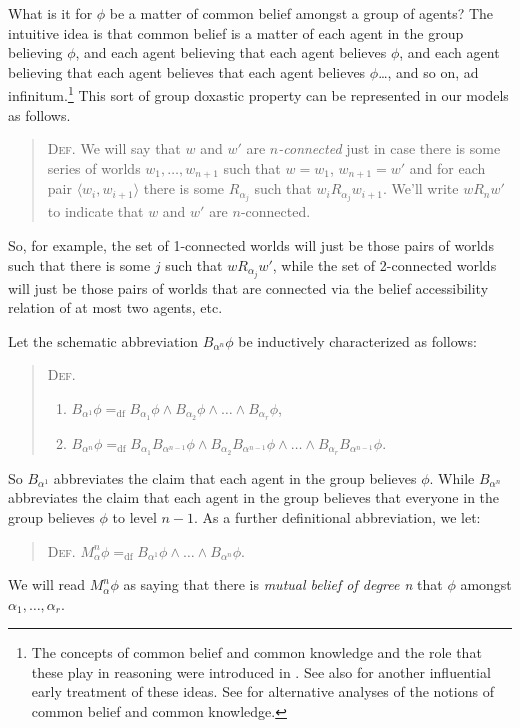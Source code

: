 What is it for $\phi$ be a matter of common belief amongst a group of agents?
The intuitive idea is that common belief is a matter of each agent in the group believing $\phi$, and each agent believing that each agent believes $\phi$, and each agent believing that each agent believes that each agent believes $\phi$\ldots, and so on, ad infinitum.\footnote{The concepts of common belief and common knowledge and the role that these play in reasoning were introduced in \citet{Lewis7}. See also \citet{Aumann2} for another influential early treatment of these ideas. See \citet{Barwise1} for alternative analyses of the notions of common belief and common knowledge.}
This sort of group doxastic property can be represented in our models as follows.
\begin{quote}
\textsc{Def.}\; We will say that $w$ and $w'$ are \textit{$n$-connected} just in case there is some series of worlds $w_1,\ldots,w_{n + 1}$ such that $w = w_1$, $w_{n+1} = w'$ and for each pair $\langle w_i, w_{i+1} \rangle$ there is some $R_{\alpha_j}$ such that $w_i R_{\alpha_j} w_{i+1}$. We'll write $w R_n w'$ to indicate that $w$ and $w'$ are $n$-connected.
\end{quote}
So, for example, the set of 1-connected worlds will just be those pairs of worlds such that there is some $j$ such that $w R_{\alpha_j} w'$, while the set of 2-connected worlds will just be those pairs of worlds that are connected via the belief accessibility relation of at most two agents, etc.

Let the schematic abbreviation $B_{\alpha^n} \phi$ be inductively characterized as follows:
\begin{quote}
\textsc{Def.}\; 
\begin{enumerate}
\item $B_{\alpha^1} \phi =_{\textrm{df}} B_{\alpha_1} \phi \wedge B_{\alpha_2} \phi \wedge\ldots\wedge B_{\alpha_r} \phi$, 
\item $B_{\alpha^n} \phi =_{\textrm{df}} B_{\alpha_1} B_{\alpha^{n-1}} \phi \wedge B_{\alpha_2} B_{\alpha^{n-1}} \phi \wedge\ldots\wedge B_{\alpha_r} B_{\alpha^{n-1}} \phi$.
\end{enumerate}
\end{quote}
So $B_{\alpha^1}$ abbreviates the claim that each agent in the group believes $\phi$.
While $B_{\alpha^n}$ abbreviates the claim that each agent in the group believes that everyone in the group believes $\phi$ to level $n-1$.
As a further definitional abbreviation, we let:
\begin{quote}
\textsc{Def.}\; $M_\alpha^n \phi =_{\textrm{df}} B_{\alpha^1} \phi \wedge\ldots\wedge B_{\alpha^n} \phi$.
\end{quote}
We will read $M_\alpha^n \phi$ as saying that there is \textit{mutual belief of degree n} that $\phi$ amongst $\alpha_1, \ldots, \alpha_r$.


